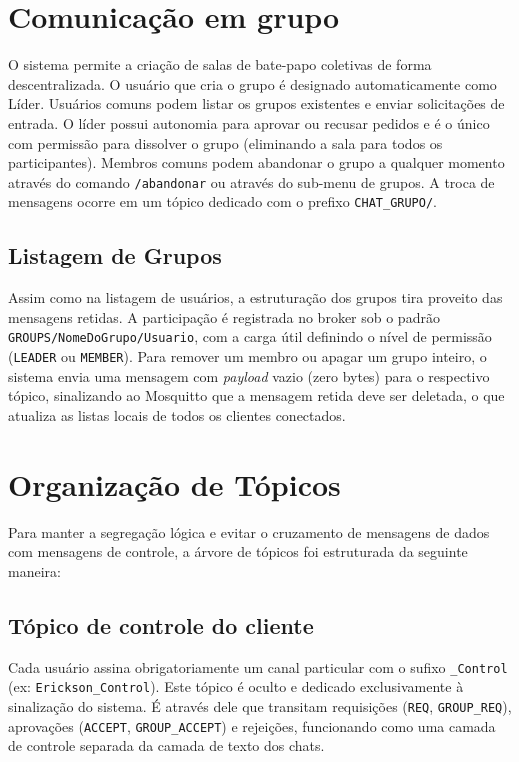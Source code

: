 \documentclass{report}
\begin{document}
\section{Comunicação em grupo}
O sistema permite a criação de salas de bate-papo coletivas de forma descentralizada. O usuário que cria o grupo é designado automaticamente como Líder. Usuários comuns podem listar os grupos existentes e enviar solicitações de entrada. O líder possui autonomia para aprovar ou recusar pedidos e é o único com permissão para dissolver o grupo (eliminando a sala para todos os participantes). Membros comuns podem abandonar o grupo a qualquer momento através do comando \texttt{/abandonar} ou através do sub-menu de grupos. A troca de mensagens ocorre em um tópico dedicado com o prefixo \texttt{CHAT\_GRUPO/}.
\subsection{Listagem de Grupos}
Assim como na listagem de usuários, a estruturação dos grupos tira proveito das mensagens retidas. A participação é registrada no broker sob o padrão \texttt{GROUPS/NomeDoGrupo/Usuario}, com a carga útil definindo o nível de permissão (\texttt{LEADER} ou \texttt{MEMBER}). Para remover um membro ou apagar um grupo inteiro, o sistema envia uma mensagem com \textit{payload} vazio (zero bytes) para o respectivo tópico, sinalizando ao Mosquitto que a mensagem retida deve ser deletada, o que atualiza as listas locais de todos os clientes conectados.

\section{Organização de Tópicos}
Para manter a segregação lógica e evitar o cruzamento de mensagens de dados com mensagens de controle, a árvore de tópicos foi estruturada da seguinte maneira:
\subsection{Tópico de controle do cliente}
Cada usuário assina obrigatoriamente um canal particular com o sufixo \texttt{\_Control} (ex: \texttt{Erickson\_Control}). Este tópico é oculto e dedicado exclusivamente à sinalização do sistema. É através dele que transitam requisições (\texttt{REQ}, \texttt{GROUP\_REQ}), aprovações (\texttt{ACCEPT}, \texttt{GROUP\_ACCEPT}) e rejeições, funcionando como uma camada de controle separada da camada de texto dos chats.
\end{document}
